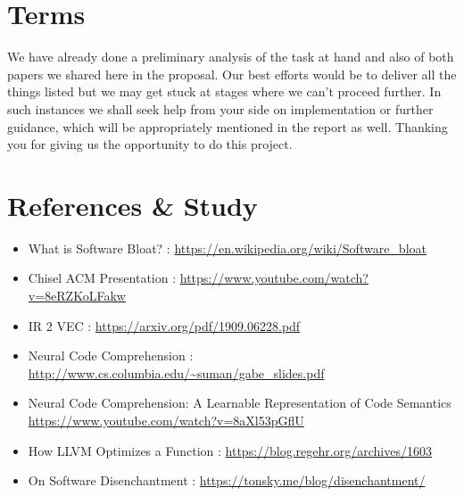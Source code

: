 \documentclass{article} %
\begin{document}
\section*{Terms}
We have already done a preliminary analysis of the task at hand and also of both papers we shared here in the proposal. 
Our best efforts would be to deliver all the things listed but we may get stuck at stages where we can't proceed further. In such instances  we shall seek help from your side on implementation or further guidance, which will be appropriately mentioned in the report as well. Thanking you for giving us the opportunity to do this project.  

\section*{References \& Study}
\begin{itemize}
    \item What is Software Bloat? : \url{https://en.wikipedia.org/wiki/Software_bloat}
    \item Chisel ACM Presentation : \url{https://www.youtube.com/watch?v=8eRZKoLFakw}
    \item IR 2 VEC : \url{https://arxiv.org/pdf/1909.06228.pdf}
    \item Neural Code Comprehension : \url{http://www.cs.columbia.edu/~suman/gabe_slides.pdf}
    \item Neural Code Comprehension: A Learnable Representation of Code Semantics \url{https://www.youtube.com/watch?v=8aXl53pGflU}
    \item How LLVM Optimizes a Function : \url{https://blog.regehr.org/archives/1603}
    \item On Software Disenchantment : \url{https://tonsky.me/blog/disenchantment/}
\end{itemize}
\end{document}
